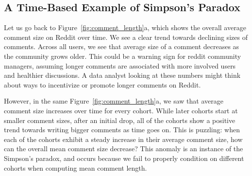 \subsection{A Time-Based Example of Simpson's Paradox}

Let us go back to Figure~\ref{fig:comment_length}a, which shows the overall average comment size on Reddit over time. We see a clear trend towards declining sizes of comments.  Across all users, we see that average size of a comment decreases as the community grows older. This could be a warning sign for reddit community managers, assuming longer comments are associated with more involved users and healthier discussions. A data analyst looking at these numbers might think about ways to incentivize or promote longer comments on Reddit. 

However, in the same Figure~\ref{fig:comment_length}a, we saw that average comment size increases over time for every cohort. While later cohorts start at smaller comment sizes, after an initial drop, all of the cohorts show a positive trend towards writing bigger comments as time goes on.  This is puzzling: when each of the cohorts exhibit a steady increase in their average comment size, how can the overall mean comment size decrease?  This anomaly is an instance of the Simpson's paradox, and occurs because we fail to properly condition on different cohorts when computing mean comment length. 


